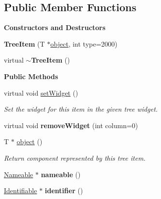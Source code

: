 \subsection*{Public Member Functions}
\begin{Indent}\textbf{ Constructors and Destructors}\par
\begin{DoxyCompactItemize}
\item 
\mbox{\label{classrev_1_1_view_1_1_tree_item_a811eb8cb2e17c5ffb4be29efa7c0a356}} 
{\bfseries Tree\+Item} (T $\ast$\mbox{\hyperlink{classrev_1_1_view_1_1_tree_item_ae06a88cde57d89ecf93f8997efcacc24}{object}}, int type=2000)
\item 
\mbox{\label{classrev_1_1_view_1_1_tree_item_a503897c20dcf5e7372fdd55f5fd4c408}} 
virtual {\bfseries $\sim$\+Tree\+Item} ()
\end{DoxyCompactItemize}
\end{Indent}
\begin{Indent}\textbf{ Public Methods}\par
\begin{DoxyCompactItemize}
\item 
virtual void \mbox{\hyperlink{classrev_1_1_view_1_1_tree_item_a24faa4e374ec0728c7eda8f50ca575df}{set\+Widget}} ()
\begin{DoxyCompactList}\small\item\em Set the widget for this item in the given tree widget. \end{DoxyCompactList}\item 
\mbox{\label{classrev_1_1_view_1_1_tree_item_afac29c27cadc276138f4e03b97033312}} 
virtual void {\bfseries remove\+Widget} (int column=0)
\item 
\mbox{\label{classrev_1_1_view_1_1_tree_item_ae06a88cde57d89ecf93f8997efcacc24}} 
T $\ast$ \mbox{\hyperlink{classrev_1_1_view_1_1_tree_item_ae06a88cde57d89ecf93f8997efcacc24}{object}} ()
\begin{DoxyCompactList}\small\item\em Return component represented by this tree item. \end{DoxyCompactList}\item 
\mbox{\label{classrev_1_1_view_1_1_tree_item_a1d27305a92d9ae820060a068df17c5a4}} 
\mbox{\hyperlink{classrev_1_1_nameable}{Nameable}} $\ast$ {\bfseries nameable} ()
\item 
\mbox{\label{classrev_1_1_view_1_1_tree_item_a20f7fd229e9ca8709e4cd969925b8694}} 
\mbox{\hyperlink{classrev_1_1_identifiable}{Identifiable}} $\ast$ {\bfseries identifier} ()
\end{DoxyCompactItemize}
\end{Indent}
